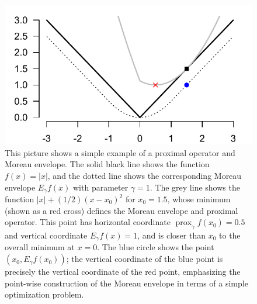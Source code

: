 \documentclass{mynotes}
\newcommand{\prox}{ \mathop{\mathrm{prox}} }
\begin{document}
\begin{figure}
\includegraphics{moreau_envelope.pdf}
\caption{This picture shows a simple example of a proximal operator and Moreau envelope.  The solid black line shows the function $f(x) = |x|$, and the dotted line shows the corresponding Moreau envelope $E_{\gamma} f (x)$ with parameter $\gamma=1$.  The grey line shows the function 
  $|x| + (1/2)(x-x_0)^2$ for $x_0 = 1.5$, whose minimum (shown as a red cross)
  defines the Moreau envelope and proximal operator.  This point has horizontal coordinate
  $\prox_\gamma f(x_0) = 0.5$ and vertical coordinate $E_{\gamma} f (x) = 1$, and is closer than $x_0$
  to the overall minimum at $x=0$.  The blue circle shows the point 
  $(x_0, E_{\gamma} f (x_0))$; the vertical coordinate of the blue point is precisely the vertical coordinate of the red point, emphasizing the point-wise construction of the Moreau
  envelope in terms of a simple optimization problem.
}
\end{figure}
\end{document}
